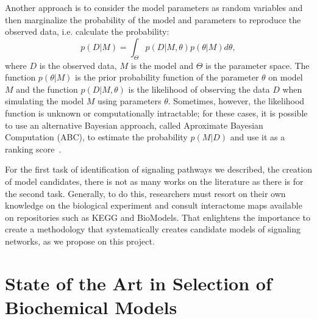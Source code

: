 Another approach is to consider the model parameters as random variables 
and then marginalize the probability of the model and parameters to 
reproduce the observed data, i.e. calculate the probability:
\begin{equation*}
    p (D | M) = \int_{\Theta} p (D | M, \theta) p (\theta | M) d\theta,
\end{equation*}
where $D$ is the observed data, $M$ is the model and $\Theta$ is the 
parameter space. The function $p(\theta | M)$ is the prior probability 
function of the parameter $\theta$ on model $M$ and the function 
$p (D | M, \theta)$ is the likelihood of observing the data $D$ when
simulating the model $M$ using parameters $\theta$. Sometimes, however,
the likelihood function is unknown or computationally intractable; for
these cases, it is possible to use an alternative Bayesian approach, 
called Aproximate Bayesian Computation (ABC), to estimate the 
probability $p (M | D)$ and use it as a ranking score~\cite{Toni2009}.

For the first task of identification of signaling pathways we described, 
the creation of model candidates, there is not as many works on the 
literature as there is for the second task. Generally, to do this,
researchers must resort on their own knowledge on the biological 
experiment and consult interactome maps available on repositories such 
as KEGG and BioModels. That enlightens the importance to create a 
methodology that systematically creates candidate models of signaling 
networks, as we propose on this project.



\section{State of the Art in Selection of Biochemical Models}





